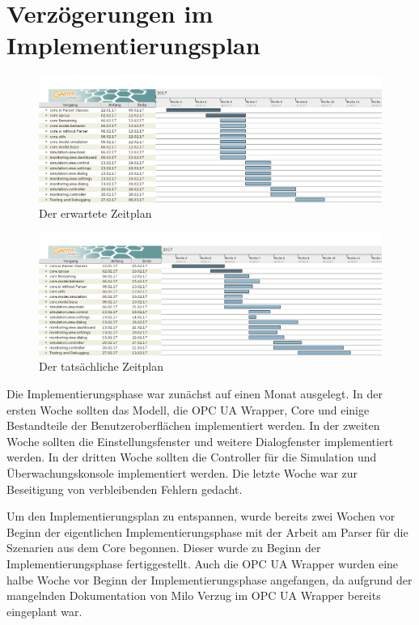\documentclass[parskip=full]{scrartcl}
\begin{document}
\section{Verzögerungen im Implementierungsplan}
\begin{figure}[H]
  \centering
  \includegraphics[scale=0.35]{media/GanttDiagram/pseGantt.png}
  \caption{Der erwartete Zeitplan}
\end{figure}

\begin{figure}[H]
  \centering
  \includegraphics[scale=0.35]{media/GanttDiagram/pseGanttReal.png}
  \caption{Der tatsächliche Zeitplan}
\end{figure}

Die Implementierungsphase war zunächst auf einen Monat ausgelegt.
In der ersten Woche sollten das Modell, die OPC UA Wrapper, Core und einige Bestandteile der Benutzeroberflächen
implementiert werden.
In der zweiten Woche sollten die Einstellungsfenster und weitere Dialogfenster implementiert werden.
In der dritten Woche sollten die Controller für die Simulation und Überwachungskonsole implementiert werden.
Die letzte Woche war zur Beseitigung von verbleibenden Fehlern gedacht.

Um den Implementierungsplan zu entspannen, wurde bereits zwei Wochen vor Beginn der eigentlichen Implementierungsphase
mit der Arbeit am Parser für die Szenarien aus dem Core begonnen. Dieser wurde zu Beginn der Implementierungsphase fertiggestellt.
Auch die OPC UA Wrapper wurden eine halbe Woche vor Beginn der Implementierungsphase angefangen, da aufgrund der mangelnden Dokumentation von Milo Verzug im OPC UA Wrapper bereits eingeplant war.
\end{document}
